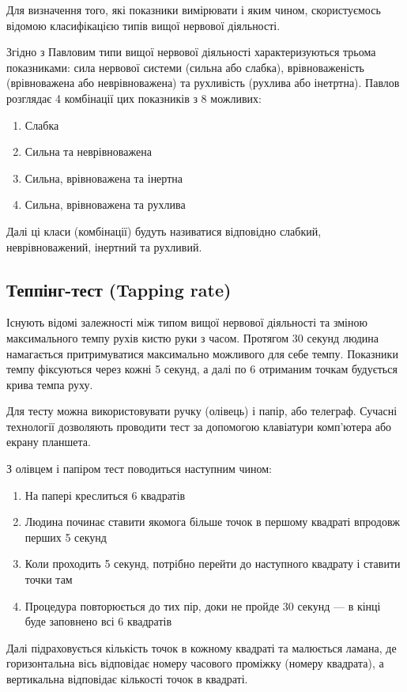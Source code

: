 Для визначення того, які показники вимірювати і яким чином,
скористуємось відомою класифікацією типів вищої нервової діяльності.

Згідно з Павловим\cite{Pavlov:1923} типи вищої нервової діяльності
характеризуються трьома показниками: сила нервової системи (сильна або слабка),
врівноваженість (врівноважена або неврівноважена)
та рухливість (рухлива або інетртна).
Павлов розглядає 4 комбінації цих показників з 8 можливих:
\begin{enumerate}
  \item Слабка
  \item Сильна та неврівноважена
  \item Сильна, врівноважена та інертна
  \item Сильна, врівноважена та рухлива
\end{enumerate}
Далі ці класи (комбінації) будуть називатися відповідно слабкий,
неврівноважений, інертний та рухливий.

\subsection{Теппінг-тест (Tapping rate)}

Існують відомі залежності між типом вищої нервової діяльності та зміною
максимального темпу рухів кистю руки з часом.
Протягом 30 секунд людина намагається притримуватися максимально можливого для
себе темпу.
Показники темпу фіксуються через кожні 5 секунд, а далі по 6 отриманим точкам
будується крива темпа руху. \cite{Ilin:2001}

Для тесту можна використовувати ручку (олівець) і папір, або телеграф.
Сучасні технології дозволяють проводити тест за допомогою клавіатури комп’ютера
або екрану планшета.

З олівцем і папіром тест поводиться наступним чином:
\begin{enumerate}
  \item На папері креслиться 6 квадратів
  \item Людина починає ставити якомога більше точок в першому квадраті впродовж
    перших 5 секунд
  \item Коли проходить 5 секунд, потрібно перейти до наступного квадрату і
    ставити точки там
  \item Процедура повторюється до тих пір, доки не пройде 30 секунд --- в кінці
    буде заповнено всі 6 квадратів
\end{enumerate}
Далі підраховується кількість точок в кожному квадраті та малюється ламана, де
горизонтальна вісь відповідає номеру часового проміжку (номеру квадрата), а
вертикальна відповідає кількості точок в квадраті.

